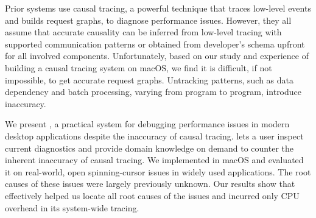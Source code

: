 Prior systems use causal tracing, a powerful technique that traces low-level
events and builds request graphs, to diagnose performance issues. However, they
all assume that accurate causality can be inferred from low-level tracing with
supported communication patterns or obtained from developer's schema upfront
for all involved components.  Unfortunately, based on our study and experience
of building a causal tracing system on macOS, we find it is difficult, if not
impossible, to get accurate request graphs.  Untracking patterns, such as data
dependency and batch processing, varying from program to program, introduce
inaccuracy. 

We present \xxx, a practical system for debugging performance issues in modern
desktop applications despite the inaccuracy of causal tracing. \xxx lets a user
inspect current diagnostics and provide domain knowledge on demand to counter
the inherent inaccuracy of causal tracing. We implemented \xxx in macOS and
evaluated it on \nbug real-world, open spinning-cursor issues in widely used
applications. The root causes of these issues were largely previously unknown.
Our results show that \xxx effectively helped us locate all root causes of the
issues and incurred only \cpuoverhead CPU overhead in its system-wide tracing.
